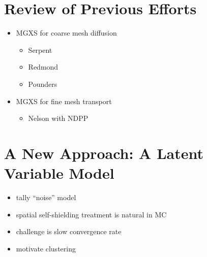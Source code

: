 \section{Review of Previous Efforts}
\label{sec:chap3-lit-review}

\begin{itemize}[noitemsep]
  \item \ac{MGXS} for coarse mesh diffusion
  \begin{itemize}[noitemsep]
    \item Serpent
    \item Redmond
    \item Pounders
  \end{itemize}
  \item \ac{MGXS} for fine mesh transport
  \begin{itemize}[noitemsep]
    \item Nelson with NDPP
  \end{itemize}
\end{itemize}


\section{A New Approach: A Latent Variable Model}
\label{sec:chap3-latent-variables}

\begin{itemize}[noitemsep]
  \item tally ``noise'' model
  \item spatial self-shielding treatment is natural in \ac{MC}
  \item challenge is slow convergence rate
  \item motivate clustering
\end{itemize}